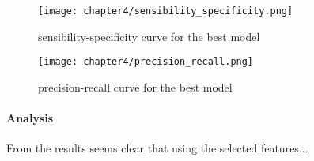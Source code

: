 \begin{figure}[h]
	\centering
	\texttt{[image: chapter4/sensibility\_specificity.png]}
	\caption{sensibility-specificity curve for the best model}
	\label{fig:sensibility_specificity_best}
\end{figure}

\begin{figure}[h]
	\centering
	\texttt{[image: chapter4/precision\_recall.png]}
	\caption{precision-recall curve for the best model}
	\label{fig:precision_recall_best}
\end{figure}

\paragraph{Analysis}
From the results seems clear that using the selected features...
